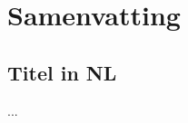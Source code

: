 \chapter*{Samenvatting}\label{ch:samenvatting}

\begin{otherlanguage}{dutch} %

\section*{Titel in NL}

...


\end{otherlanguage}
